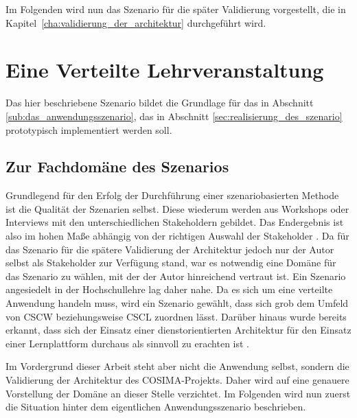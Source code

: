   
  Im Folgenden wird nun das Szenario für die später Validierung vorgestellt, die in Kapitel~\ref{cha:validierung_der_architektur} durchgeführt wird.
  

\section{Eine Verteilte Lehrveranstaltung} %
\label{sec:hochschulszenario}

  Das hier beschriebene Szenario bildet die Grundlage für das in Abschnitt \ref{sub:das_anwendungsszenario}, das in Abschnitt \ref{sec:realisierung_des_szenario} prototypisch implementiert werden soll.

\subsection{Zur Fachdomäne des Szenarios} %
\label{sub:zur_fachdomaene_des_szenarios}

  Grundlegend für den Erfolg der Durchführung einer szenariobasierten Methode ist die Qualität der Szenarien selbst. Diese wiederum werden aus Workshops oder Interviews mit den unterschiedlichen Stakeholdern gebildet. Das Endergebnis ist also im hohen Maße abhängig von der richtigen Auswahl der Stakeholder \citep[S. 187]{evaluating_software_architectures}. Da für das Szenario für die spätere Validierung der Architektur jedoch nur der Autor selbst als Stakeholder zur Verfügung stand, war es notwendig eine Domäne für das Szenario zu wählen, mit der der Autor hinreichend vertraut ist. Ein Szenario angesiedelt in der Hochschullehre lag daher nahe. Da es sich um eine verteilte Anwendung handeln muss, wird ein Szenario gewählt, dass sich grob dem Umfeld von CSCW beziehungsweise CSCL zuordnen lässt. Darüber hinaus wurde bereits erkannt, dass sich der Einsatz einer dienstorientierten Architektur für den Einsatz einer Lernplattform durchaus als sinnvoll zu erachten ist \citep{campus_source}.
  
  Im Vordergrund dieser Arbeit steht aber nicht die Anwendung selbst, sondern die Validierung der Architektur des COSIMA-Projekts. Daher wird auf eine genauere Vorstellung der Domäne an dieser Stelle verzichtet. Im Folgenden wird nun zuerst die Situation hinter dem eigentlichen Anwendungsszenario beschrieben.

